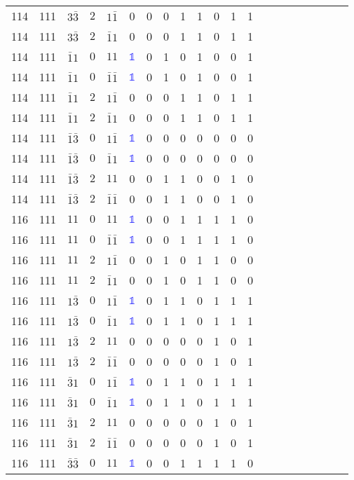 \begin{longtable*}{c| cccccccccccccccccccc }
114& 111& $3\bar{3}$& $2$& $1\bar{1}$& 0& 0& 0& 1& 1& 0& 1& 1\\
114& 111& $3\bar{3}$& $2$& $\bar{1}1$& 0& 0& 0& 1& 1& 0& 1& 1\\
114& 111& $\bar{1}1$& $0$& $11$& \textcolor{blue}{$\mathds{1}$}& 0& 1& 0& 1& 0& 0& 1\\
114& 111& $\bar{1}1$& $0$& $\bar{1}\bar{1}$& \textcolor{blue}{$\mathds{1}$}& 0& 1& 0& 1& 0& 0& 1\\
114& 111& $\bar{1}1$& $2$& $1\bar{1}$& 0& 0& 0& 1& 1& 0& 1& 1\\
114& 111& $\bar{1}1$& $2$& $\bar{1}1$& 0& 0& 0& 1& 1& 0& 1& 1\\
114& 111& $\bar{1}\bar{3}$& $0$& $1\bar{1}$& \textcolor{blue}{$\mathds{1}$}& 0& 0& 0& 0& 0& 0& 0\\
114& 111& $\bar{1}\bar{3}$& $0$& $\bar{1}1$& \textcolor{blue}{$\mathds{1}$}& 0& 0& 0& 0& 0& 0& 0\\
114& 111& $\bar{1}\bar{3}$& $2$& $11$& 0& 0& 1& 1& 0& 0& 1& 0\\
114& 111& $\bar{1}\bar{3}$& $2$& $\bar{1}\bar{1}$& 0& 0& 1& 1& 0& 0& 1& 0\\
116& 111& $11$& $0$& $11$& \textcolor{blue}{$\mathds{1}$}& 0& 0& 1& 1& 1& 1& 0\\
116& 111& $11$& $0$& $\bar{1}\bar{1}$& \textcolor{blue}{$\mathds{1}$}& 0& 0& 1& 1& 1& 1& 0\\
116& 111& $11$& $2$& $1\bar{1}$& 0& 0& 1& 0& 1& 1& 0& 0\\
116& 111& $11$& $2$& $\bar{1}1$& 0& 0& 1& 0& 1& 1& 0& 0\\
116& 111& $1\bar{3}$& $0$& $1\bar{1}$& \textcolor{blue}{$\mathds{1}$}& 0& 1& 1& 0& 1& 1& 1\\
116& 111& $1\bar{3}$& $0$& $\bar{1}1$& \textcolor{blue}{$\mathds{1}$}& 0& 1& 1& 0& 1& 1& 1\\
116& 111& $1\bar{3}$& $2$& $11$& 0& 0& 0& 0& 0& 1& 0& 1\\
116& 111& $1\bar{3}$& $2$& $\bar{1}\bar{1}$& 0& 0& 0& 0& 0& 1& 0& 1\\
116& 111& $\bar{3}1$& $0$& $1\bar{1}$& \textcolor{blue}{$\mathds{1}$}& 0& 1& 1& 0& 1& 1& 1\\
116& 111& $\bar{3}1$& $0$& $\bar{1}1$& \textcolor{blue}{$\mathds{1}$}& 0& 1& 1& 0& 1& 1& 1\\
116& 111& $\bar{3}1$& $2$& $11$& 0& 0& 0& 0& 0& 1& 0& 1\\
116& 111& $\bar{3}1$& $2$& $\bar{1}\bar{1}$& 0& 0& 0& 0& 0& 1& 0& 1\\
116& 111& $\bar{3}\bar{3}$& $0$& $11$& \textcolor{blue}{$\mathds{1}$}& 0& 0& 1& 1& 1& 1& 0\\

\end{longtable*}

